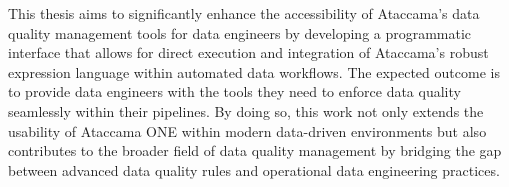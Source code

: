  This thesis aims to significantly enhance the accessibility of Ataccama's data quality management tools for data engineers by developing a programmatic interface that allows for direct execution and integration of Ataccama's robust expression language within automated data workflows. The expected outcome is to provide data engineers with the tools they need to enforce data quality seamlessly within their pipelines. By doing so, this work not only extends the usability of Ataccama ONE within modern data-driven environments but also contributes to the broader field of data quality management by bridging the gap between advanced data quality rules and operational data engineering practices.
